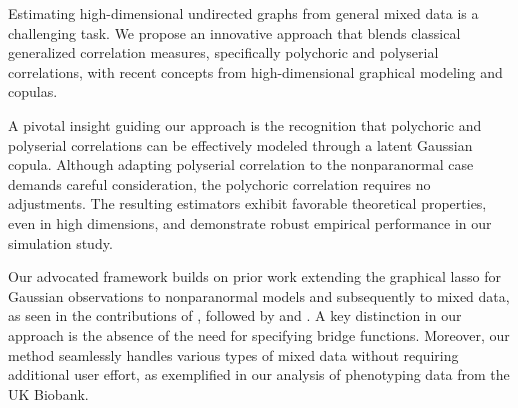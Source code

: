 Estimating high-dimensional undirected graphs from general mixed data is a challenging task. We propose an innovative approach that blends classical generalized correlation measures, specifically polychoric and polyserial correlations, with recent concepts from high-dimensional graphical modeling and copulas.

A pivotal insight guiding our approach is the recognition that polychoric and polyserial correlations can be effectively modeled through a latent Gaussian copula. Although adapting polyserial correlation to the nonparanormal case demands careful consideration, the polychoric correlation requires no adjustments. The resulting estimators exhibit favorable theoretical properties, even in high dimensions, and demonstrate robust empirical performance in our simulation study.

Our advocated framework builds on prior work extending the graphical lasso for Gaussian observations to nonparanormal models and subsequently to mixed data, as seen in the contributions of \cite{Fan17}, followed by \cite{Quan18} and \cite{Feng19}. A key distinction in our approach is the absence of the need for specifying bridge functions. Moreover, our method seamlessly handles various types of mixed data without requiring additional user effort, as exemplified in our analysis of phenotyping data from the UK Biobank.